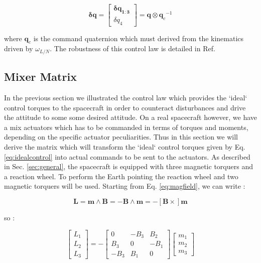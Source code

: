 \documentclass[11pt,a4paper]{report}
\begin{document}
\begin{equation}
 \mathbf{\delta q} =                                       
                      \begin{bmatrix}
                           \mathbf{\delta q_{1:3}} \\
                           \mathit{\delta q_{4}}
                      \end{bmatrix}
                                                             = \mathbf{q} \otimes {\mathbf{q}_{c}}^{-1}
\end{equation}

where $\mathbf{q}_{c}$ is the command quaternion which must derived from the kinematics driven by $\omega_{L/N}$.
The robustness of this control law is detailed in Ref. \cite{Ref:Books:Fundamentals}

\subsection{Mixer Matrix}
In the previous section we illustrated the control law which provides the `ideal` control torques to the spacecraft in order to counteract disturbances and drive the attitude to some some desired attitude.
On a real spacecraft however, we have a mix actuators which has to be commanded in terms of torques and moments, depending on the specific actuator peculiarities.
Thus in this section we will derive the matrix which will transform the `ideal` control torques given by Eq. \ref{eq:idealcontrol} into actual commands to be sent to the actuators. 
As described in Sec. \ref{sec:general}, the spacecraft is equipped with three magnetic torquers and a reaction wheel. 
To perform the Earth pointing the reaction wheel and two magnetic torquers will be used.
Starting from Eq. \ref{eq:magfield}, we can write :

\begin{equation}
 \mathbf{L} = \mathbf{m} \wedge \mathbf{B} = - \mathbf{B} \wedge \mathbf{m} = -[\mathbf{B} \times] \mathbf{m} 
\end{equation}

so : 


\begin{equation}
 \begin{bmatrix}
    L_1\\
    L_2\\
    L_3 
 \end{bmatrix}
= - 
 \begin{bmatrix}
    0 & -B_{3} & B_{2} \\
    B_{3} & 0 & -B_{1} \\
   -B_{3} & B_{1} & 0
 \end{bmatrix} 
 \begin{bmatrix}
    m_{1}\\
    m_{2}\\
    m_{3}
 \end{bmatrix}  
\end{equation}
\end{document}
